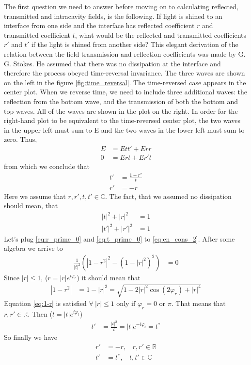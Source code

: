 \documentclass{article}
\numberwithin{equation}{section}
\begin{document}
The first question we need to answer before moving on to calculating reflected, transmitted and intracavity fields, is the following. If light is shined to an interface from one side and the interface has reflected coefficient $r$ and transmitted coefficient $t$, what would be the reflected and transmitted coefficients $r'$ and $t'$ if the light is shined from another side? This elegant derivation \cite{Nagourney2014} of the relation between the field transmission and reflection
coefficients was made by G. G. Stokes. He assumed that there was no dissipation at the interface and therefore the process obeyed time-reversal invariance. The three waves are shown on the left in the figure \ref{fig:time_reversal}. The time-reversed case appears in the center plot. When we reverse time, we need to include three additional waves: the reflection from the bottom wave, and the transmission of both the bottom and top waves. All of the waves are shown in the plot on the right. In order for the right-hand plot to be equivalent to the time-reversed center plot, the two waves in the upper left must sum to E and the two waves in the lower left must
sum to zero. Thus,
\begin{align}
E &= E t t' + E r r \\
0 &= E r t + E r' t
\end{align}
from which we conclude that
\begin{align}
t' &= \frac{1 - r^2}{t} \label{eq:t_prime_0}\\
r' &= - r \label{eq:r_prime_0}
\end{align}
Here we assume that $r,r',t,t' \in \mathbb{C}$. The fact, that we assumed no dissipation should mean, that
\begin{align}
|t|^2 + |r|^2 &= 1 \label{eq:en_cons_1}\\
|t'|^2 + |r'|^2 &= 1 \label{eq:en_cons_2}
\end{align}
Let's plug \ref{eq:r_prime_0} and \ref{eq:t_prime_0} to \ref{eq:en_cons_2}. After some algebra we arrive to 
\begin{align}
    \frac{1}{|t|^2} (|1-r^2|^2-(1-|r|^2)^2) &= 0
\end{align}
Since $|r| \le 1$, ($r = |r| e^{i \varphi_r}$) it should mean that 
\begin{align}
    |1-r^2| &= 1-|r|^2 = \sqrt{1-2 |r|^2 \cos (2 \varphi_r) + |r|^4} \label{eq:1-r}
\end{align}
Equation \ref{eq:1-r} is satisfied $\forall ~|r| \le 1$ only if $\varphi_r = 0$ or $\pi$. That means that $r,r' \in \mathbb{R}$. Then ($t = |t| e^{i \varphi_t}$)
\begin{align}
    t' &= \frac{|t|^2}{t} = |t| e^{-i \varphi_t} = t^*
\end{align}
So finally we have
\begin{align}
    r' &= -r , ~~~~r,r' \in \mathbb{R} \label{eq:r_prime}\\
    t' &= t^*, ~~~~t,t' \in \mathbb{C} \label{eq:t_prime}
\end{align}
\end{document}
